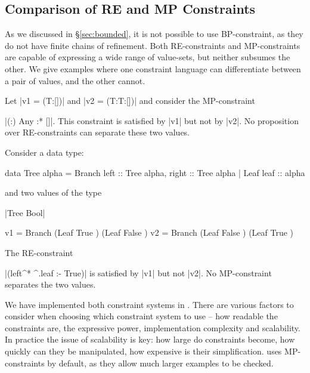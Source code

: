 \subsection{Comparison of RE and MP Constraints}

As we discussed in \S\ref{sec:bounded}, it is not possible to use BP-constraint, as they do not have finite chains of refinement. Both RE-constraints and MP-constraints are capable of expressing a wide range of value-sets, but neither subsumes the other. We give examples where one constraint language can differentiate between a pair of values, and the other cannot.

\begin{comment}
\begin{code}
data T = T
\end{code}
\end{comment}

\begin{example}
Let |v1 = (T:[])| and |v2 = (T:T:[])| and consider the MP-constraint \ignore|{(:) Any} :* {[]}|. This constraint is satisfied by |v1| but not by |v2|. No proposition over RE-constraints can separate these two values.
\end{example}

\begin{example}
Consider a data type:

\begin{code}
data Tree alpha  =  Branch  {left  :: Tree alpha, right :: Tree alpha}
                 |  Leaf    {leaf  :: alpha}
\end{code}

\noindent and two values of the type \ignore|Tree Bool|

\begin{code}
v1 = Branch (Leaf True   ) (Leaf False  )
v2 = Branch (Leaf False  ) (Leaf True   )
\end{code}

\noindent The RE-constraint \ignore|(left^* ^.leaf :- True)| is satisfied by |v1| but not |v2|. No MP-constraint separates the two values.
\end{example}

We have implemented both constraint systems in \catch{}. There are various factors to consider when choosing which constraint system to use -- how readable the constraints are, the expressive power, implementation complexity and scalability. In practice the issue of scalability is key: how large do constraints become, how quickly can they be manipulated, how expensive is their simplification. \newtool{} uses MP-constraints by default, as they allow much larger examples to be checked.

